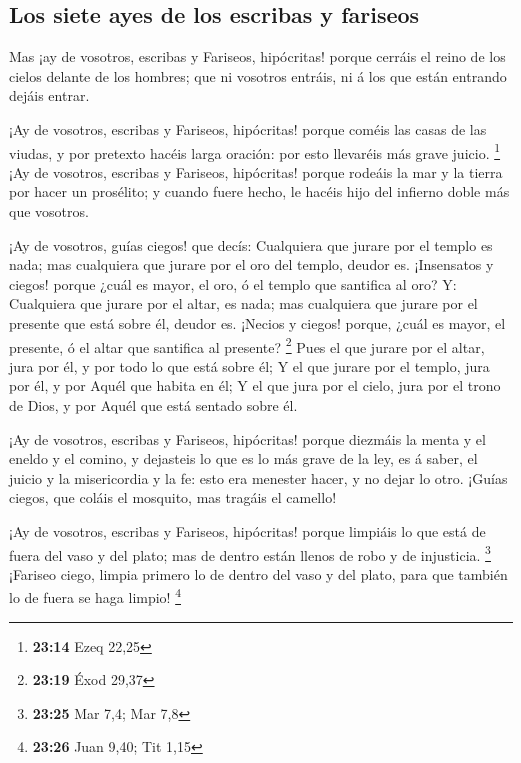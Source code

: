 \hypertarget{los-siete-ayes-de-los-escribas-y-fariseos}{%
\subsection{Los siete ayes de los escribas y
fariseos}\label{los-siete-ayes-de-los-escribas-y-fariseos}}

 Mas ¡ay de vosotros, escribas y Fariseos, hipócritas!
porque cerráis el reino de los cielos delante de los hombres; que ni
vosotros entráis, ni á los que están entrando dejáis entrar.

 ¡Ay de vosotros, escribas y Fariseos, hipócritas! porque
coméis las casas de las viudas, y por pretexto hacéis larga oración: por
esto llevaréis más grave juicio. \footnote{\textbf{23:14} Ezeq 22,25}
 ¡Ay de vosotros, escribas y Fariseos, hipócritas! porque
rodeáis la mar y la tierra por hacer un prosélito; y cuando fuere hecho,
le hacéis hijo del infierno doble más que vosotros.

 ¡Ay de vosotros, guías ciegos! que decís: Cualquiera que
jurare por el templo es nada; mas cualquiera que jurare por el oro del
templo, deudor es.  ¡Insensatos y ciegos! porque ¿cuál es
mayor, el oro, ó el templo que santifica al oro?  Y:
Cualquiera que jurare por el altar, es nada; mas cualquiera que jurare
por el presente que está sobre él, deudor es.  ¡Necios y
ciegos! porque, ¿cuál es mayor, el presente, ó el altar que santifica al
presente? \footnote{\textbf{23:19} Éxod 29,37}  Pues el
que jurare por el altar, jura por él, y por todo lo que está sobre él;
 Y el que jurare por el templo, jura por él, y por Aquél
que habita en él;  Y el que jura por el cielo, jura por
el trono de Dios, y por Aquél que está sentado sobre él.

 ¡Ay de vosotros, escribas y Fariseos, hipócritas! porque
diezmáis la menta y el eneldo y el comino, y dejasteis lo que es lo más
grave de la ley, es á saber, el juicio y la misericordia y la fe: esto
era menester hacer, y no dejar lo otro.  ¡Guías ciegos,
que coláis el mosquito, mas tragáis el camello!

 ¡Ay de vosotros, escribas y Fariseos, hipócritas! porque
limpiáis lo que está de fuera del vaso y del plato; mas de dentro están
llenos de robo y de injusticia. \footnote{\textbf{23:25} Mar 7,4; Mar
  7,8}  ¡Fariseo ciego, limpia primero lo de dentro del
vaso y del plato, para que también lo de fuera se haga limpio!
\footnote{\textbf{23:26} Juan 9,40; Tit 1,15}

